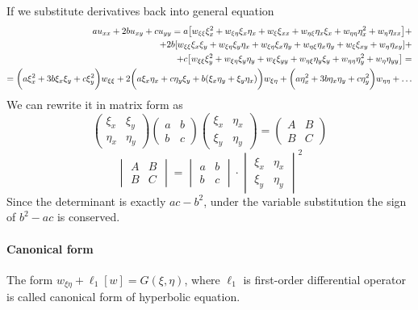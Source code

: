 If we substitute derivatives back into general equation
\begin{align*}
au_{xx} + 2bu_{xy} + cu_{yy} = a \qty[w_{\xi\xi} \xi_{x}^2 + w_{\xi\eta}\xi_x\eta_x + w_{\xi}\xi_{xx} + w_{\eta \xi}\eta_x\xi_x + w_{\eta\eta} \eta_{x}^2+ w_{\eta}\eta_{xx} ] +\\+
2b\qty[w_{\xi \xi} \xi_x\xi_y + w_{\xi\eta}\xi_y\eta_x + w_{\xi\eta}\xi_x\eta_y + w_{\eta \xi} \eta_x\eta_y + w_{\xi}\xi_{xy}+w_\eta\eta_{xy}] +\\+ 
c\qty[w_{\xi\xi} \xi_{y}^2 + w_{\xi\eta}\xi_y\eta_y + w_{\xi}\xi_{yy} + w_{\eta \xi}\eta_y\xi_y + w_{\eta\eta} \eta_{y}^2+ w_{\eta}\eta_{yy} ]  =\\=
\qty\bigg(a\xi_x^2+3b\xi_x\xi_y + c\xi_y^2)w_{\xi\xi} + 2\qty\bigg(a\xi_x\eta_x + c\eta_y\xi_y + b(\xi_x\eta_y + \xi_y\eta_x))w_{\xi\eta} + \qty\bigg(a\eta_x^2+3b\eta_x\eta_y + c\eta_y^2)w_{\eta\eta} + \dots
\end{align*}
We can rewrite it in matrix form as
$$\begin{pmatrix}
\xi_x& \xi_y \\ \eta_x & \eta_y
\end{pmatrix} \begin{pmatrix}
a&b\\b&c
\end{pmatrix} \begin{pmatrix}
\xi_x& \eta_x\\ \xi_y  & \eta_y
\end{pmatrix} = \begin{pmatrix}
A&B\\B&C
\end{pmatrix}$$
$$\begin{vmatrix}
A&B\\B&C
\end{vmatrix} = \begin{vmatrix}
a&b\\b&c
\end{vmatrix} \cdot \begin{vmatrix}
\xi_x& \eta_x\\ \xi_y  & \eta_y
\end{vmatrix}^2$$
Since the determinant is exactly $ac-b^2$, under the variable substitution the sign of $b^2-ac$ is conserved.

\paragraph{Canonical form}
The form $w_{\xi \eta} + \ell_1[w] = G(\xi, \eta)$, where $\ell_1$ is first-order differential operator is called canonical form of hyperbolic equation.
